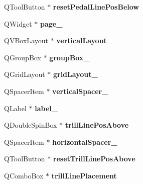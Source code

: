 \begin{DoxyCompactItemize}
Q\+Tool\+Button $\ast$ {\bfseries reset\+Pedal\+Line\+Pos\+Below}
\item 
\mbox{\label{class_ui___edit_style_base_a6db9c5a8913ff50dcd25223138817a9d}} 
Q\+Widget $\ast$ {\bfseries page\+\_}
\item 
\mbox{\label{class_ui___edit_style_base_a58e877d63407738fcc8ccd7e46862b5a}} 
Q\+V\+Box\+Layout $\ast$ {\bfseries vertical\+Layout\+\_}
\item 
\mbox{\label{class_ui___edit_style_base_ab846b1f5c23485cb74965c5f699f1414}} 
Q\+Group\+Box $\ast$ {\bfseries group\+Box\+\_}
\item 
\mbox{\label{class_ui___edit_style_base_ab6172abbd08e8774ba1b3e08d8446cb4}} 
Q\+Grid\+Layout $\ast$ {\bfseries grid\+Layout\+\_}
\item 
\mbox{\label{class_ui___edit_style_base_aad3054d46096737f56899d3ac01c240f}} 
Q\+Spacer\+Item $\ast$ {\bfseries vertical\+Spacer\+\_}
\item 
\mbox{\label{class_ui___edit_style_base_aedf403afb75d4fc87d9a7d9631816901}} 
Q\+Label $\ast$ {\bfseries label\+\_}
\item 
\mbox{\label{class_ui___edit_style_base_a83675a078b138462b6c0999cd2534130}} 
Q\+Double\+Spin\+Box $\ast$ {\bfseries trill\+Line\+Pos\+Above}
\item 
\mbox{\label{class_ui___edit_style_base_adfafaa5ae3f71a8b1296791552b31847}} 
Q\+Spacer\+Item $\ast$ {\bfseries horizontal\+Spacer\+\_}
\item 
\mbox{\label{class_ui___edit_style_base_aa78d8d4f12d21b691999efe556e7145e}} 
Q\+Tool\+Button $\ast$ {\bfseries reset\+Trill\+Line\+Pos\+Above}
\item 
\mbox{\label{class_ui___edit_style_base_a342187ea9b92e976ba7317d01f3a124e}} 
Q\+Combo\+Box $\ast$ {\bfseries trill\+Line\+Placement}

\end{DoxyCompactItemize}
